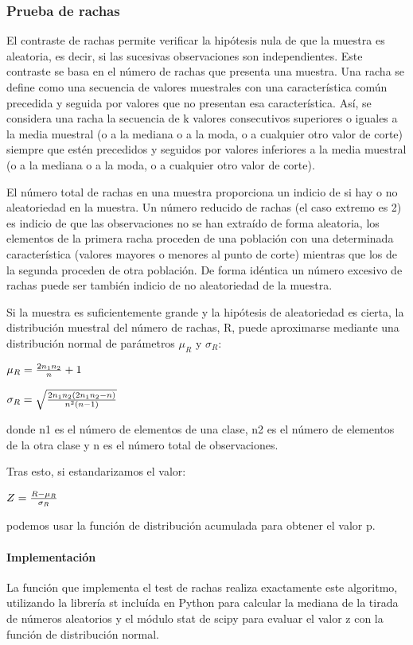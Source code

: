 \subsubsection{Prueba de rachas}
El contraste de rachas permite verificar la hipótesis nula de que la muestra es aleatoria, es decir, si las sucesivas observaciones son independientes. Este contraste se basa en el número de rachas que presenta una muestra. Una racha se define como una secuencia de valores muestrales con una característica común precedida y seguida por valores que no presentan esa característica. Así, se considera una racha la secuencia de k valores consecutivos superiores o iguales a la media muestral (o a la mediana o a la moda, o a cualquier otro valor de corte) siempre que estén precedidos y seguidos por valores inferiores a la media muestral (o a la mediana o a la moda, o a cualquier otro valor de corte).

El número total de rachas en una muestra proporciona un indicio de si hay o no aleatoriedad en la muestra. Un número reducido de rachas (el caso extremo es 2) es indicio de que las observaciones no se han extraído de forma aleatoria, los elementos de la primera racha proceden de una población con una determinada característica (valores mayores o menores al punto de corte) mientras que los de la segunda proceden de otra población. De forma idéntica un número excesivo de rachas puede ser también indicio de no aleatoriedad de la muestra.

Si la muestra es suficientemente grande y la hipótesis de aleatoriedad es cierta, la distribución muestral del número de rachas, R, puede aproximarse mediante una distribución normal de parámetros $\mu_R$ y $\sigma_R$:

$\mu_R={2n_1 n_2 \over n}+1$

$\sigma_R=\sqrt {2n_1 n_2(2n_1 n_2-n) \over n^2(n-1)}$

donde n1 es el número de elementos de una clase, n2 es el número de elementos de la otra clase y n es el número total de observaciones.

Tras esto, si estandarizamos el valor:

$Z={R-\mu_R \over \sigma_R}$

podemos usar la función de distribución acumulada para obtener el valor p.

\paragraph{Implementación}
La función que implementa el test de rachas realiza exactamente este algoritmo, utilizando la librería st incluída en
Python para calcular la mediana de la tirada de números aleatorios y el módulo stat de scipy para evaluar el valor z
con la función de distribución normal.

